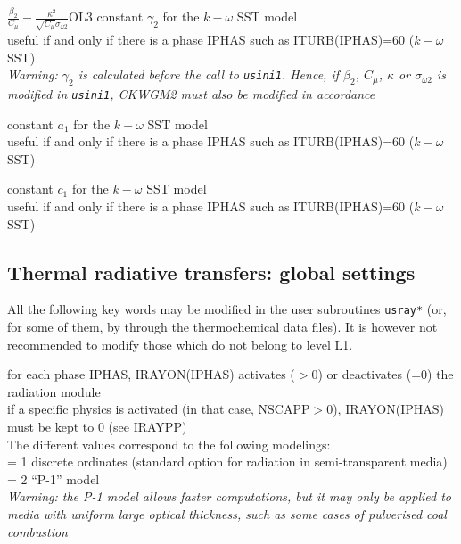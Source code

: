 {$\frac{\beta_2}{C_\mu}-\frac{\kappa^2}{\sqrt{C_\mu}\sigma_{\omega 2}}$}{O}{L3}
{constant $\gamma_2$ for the $k-\omega$ SST model\\
useful if and only if there is a phase IPHAS such as ITURB(IPHAS)=60
($k-\omega$ SST)\\
{\em Warning: $\gamma_2$ is calculated before the call to
\texttt{usini1}. Hence, if $\beta_2$, $C_\mu$, $\kappa$ or $\sigma_{\omega 2}$
is modified in \texttt{usini1}, CKWGM2 must also be modified in accordance}}

{constant $a_1$ for the $k-\omega$ SST model\\
useful if and only if there is a phase IPHAS such as ITURB(IPHAS)=60
($k-\omega$ SST)}

{constant $c_1$ for the $k-\omega$ SST model\\
useful if and only if there is a phase IPHAS such as ITURB(IPHAS)=60
($k-\omega$ SST)}


\subsection{Thermal radiative transfers: global settings}

All the following key words may be modified in the user subroutines
\texttt{usray*} (or, for some of them, by through the thermochemical data files).
It is however not recommended to modify those which do not belong to
level L1.

{for each phase IPHAS, IRAYON(IPHAS) activates ($>0$) or deactivates
(=0) the radiation module\\
if a specific physics is activated (in that case, NSCAPP$>$0),
IRAYON(IPHAS) must be kept to 0 (see IRAYPP)\\
The different values correspond to the following modelings:\\
\hspace*{1.3cm} = 1 discrete ordinates
(standard option for radiation in semi-transparent media)\\
\hspace*{1.3cm} = 2  ``P-1'' model\\
{\em Warning: the P-1 model allows faster computations, but it
may only be applied to media with uniform large optical thickness, such as
some cases of pulverised coal combustion}}

